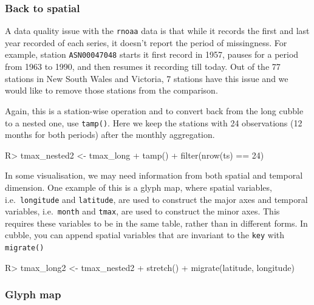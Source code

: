 \documentclass[
]{jss}
\begin{document}
\hypertarget{back-to-spatial}{%
\subsubsection{Back to spatial}\label{back-to-spatial}}

A data quality issue with the \texttt{rnoaa} data is that while it
records the first and last year recorded of each series, it doesn't
report the period of missingness. For example, station
\texttt{ASN00047048} starts it first record in 1957, pauses for a period
from 1963 to 1990, and then resumes it recording till today. Out of the
77 stations in New South Wales and Victoria, 7 stations have this issue
and we would like to remove those stations from the comparison.

Again, this is a station-wise operation and to convert back from the
long cubble to a nested one, use \texttt{tamp()}. Here we keep the
stations with 24 observations (12 months for both periods) after the
monthly aggregation.

\begin{CodeChunk}
\begin{CodeInput}
R> tmax_nested2 <- tmax_long %
+   tamp() %
+   filter(nrow(ts) == 24)
\end{CodeInput}
\end{CodeChunk}

In some visualisation, we may need information from both spatial and
temporal dimension. One example of this is a glyph map, where spatial
variables, i.e.~\texttt{longitude} and \texttt{latitude}, are used to
construct the major axes and temporal variables, i.e.~\texttt{month} and
\texttt{tmax}, are used to construct the minor axes. This requires these
variables to be in the same table, rather than in different forms. In
cubble, you can append spatial variables that are invariant to the
\texttt{key} with \texttt{migrate()}

\begin{CodeChunk}
\begin{CodeInput}
R> tmax_long2 <- tmax_nested2 %
+   stretch() %
+   migrate(latitude, longitude)
\end{CodeInput}
\end{CodeChunk}

\hypertarget{glyph-map}{%
\subsubsection{Glyph map}\label{glyph-map}}
\end{document}
